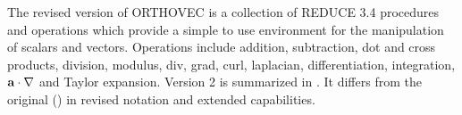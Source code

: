 

The revised version of ORTHOVEC is a collection of REDUCE 3.4 procedures and
operations which provide a simple to use environment for the manipulation of
scalars and vectors.  Operations include addition, subtraction, dot and cross
products, division, modulus, div, grad, curl, laplacian, differentiation,
integration, ${\bf a \cdot \nabla}$ and Taylor expansion.  Version 2 is
summarized in \cite{Eastwood:91}.  It differs from the original (\cite
{Eastwood:87}) in revised notation and extended capabilities.

